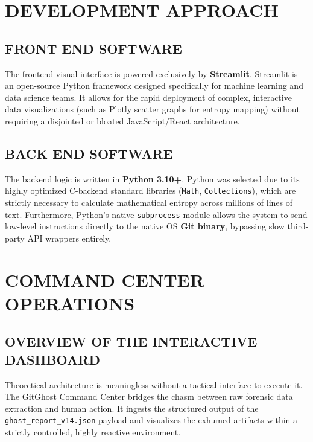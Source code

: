 \documentclass[12pt, a4paper, oneside]{report}
\begin{document}
\chapter{DEVELOPMENT APPROACH}

\section{FRONT END SOFTWARE}
The frontend visual interface is powered exclusively by \textbf{Streamlit}. Streamlit is an open-source Python framework designed specifically for machine learning and data science teams. It allows for the rapid deployment of complex, interactive data visualizations (such as Plotly scatter graphs for entropy mapping) without requiring a disjointed or bloated JavaScript/React architecture.

\section{BACK END SOFTWARE}
The backend logic is written in \textbf{Python 3.10+}. Python was selected due to its highly optimized C-backend standard libraries (\texttt{Math}, \texttt{Collections}), which are strictly necessary to calculate mathematical entropy across millions of lines of text. Furthermore, Python's native \texttt{subprocess} module allows the system to send low-level instructions directly to the native OS \textbf{Git binary}, bypassing slow third-party API wrappers entirely.

\chapter{COMMAND CENTER OPERATIONS}

\section{OVERVIEW OF THE INTERACTIVE DASHBOARD}
Theoretical architecture is meaningless without a tactical interface to execute it. The GitGhost Command Center bridges the chasm between raw forensic data extraction and human action. It ingests the structured output of the \texttt{ghost\_report\_v14.json} payload and visualizes the exhumed artifacts within a strictly controlled, highly reactive environment. 
\end{document}
